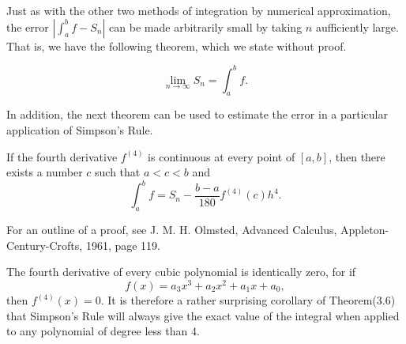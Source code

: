 Just as with the other two methods of integration by numerical approximation, the error $| \int_a^b f - S_n |$ can be made arbitrarily small by taking $n$ aufficiently large. That is, we have the following theorem, which we state without proof.

\begin{theorem} %
$$
\lim_{n \rightarrow \infty} S_n = \int_a^b f .
$$
\end{theorem}

In addition, the next theorem can be used to estimate the error in a particular application of Simpson's Rule.

\begin{theorem} %
If the fourth derivative $f^{(4)}$ is continuous at every point of $[a, b]$, then there exists a number $c$ such that $a < c < b$ and
$$
\int_a^b f = S_n - \frac{b - a}{180} f^{(4)} (c)h^4.
$$
\end{theorem}

For an outline of a proof, see J. M. H. Olmsted, Advanced Calculus, Appleton-Century-Crofts, 1961, page 119.

The fourth derivative of every cubic polynomial is identically zero, for if
$$
f(x) = a_{3}x^3 + a_{2}x^2 + a_{1}x + a_0,
$$
\noindent then $f^{(4)} (x) = 0$. It is therefore a rather surprising corollary of Theorem(3.6) that Simpson's Rule will always give the exact value of the integral when applied to any polynomial of degree less than 4.

